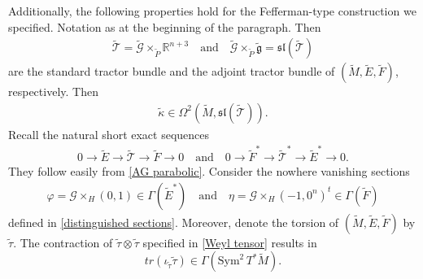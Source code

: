 \documentclass[11pt]{amsart}
\begin{document}
Additionally, the following properties hold for the  Fefferman-type construction we specified. Notation as at the beginning of the paragraph. Then
\begin{align*}
\tilde{\mathcal T}=\tilde{\mathcal G}\times_{\tilde{P}}\mathbb R^{n+3}
\quad\text{and}\quad
\tilde{\mathcal G}\times_{\tilde{P}}\tilde{\mathfrak g}=\mathfrak{sl}(\tilde{\mathcal T})
\end{align*}
are the standard tractor bundle and the adjoint tractor bundle of $(\tilde M,\tilde E,\tilde F)$, respectively. Then
\begin{align*}
    \tilde\kappa\in\Omega^2(\tilde M,\mathfrak{sl}(\tilde{\mathcal T})).
\end{align*}
Recall the natural short exact sequences
\begin{align*}
    0\to\tilde E\to\tilde{\mathcal T}\to\tilde F\to 0\quad\text{and}\quad 0\to \tilde F^*\to\tilde{\mathcal T}^*\to\tilde E^*\to 0.
\end{align*}
They follow easily from \cref{AG parabolic}. Consider the nowhere vanishing sections
\begin{align*}
\varphi=\mathcal G\times_H(0,1)\in\Gamma(\tilde E^*)
\quad\text{and}\quad
\eta=\mathcal G\times_H(-1,0^n)^t\in\Gamma(\tilde F)
\end{align*}
defined in \cref{distinguished sections}. Moreover, denote the torsion of $(\tilde M,\tilde E,\tilde F)$ by $\tilde\tau$. The contraction of $\tilde\tau\otimes\tilde\tau$ specified in \cref{Weyl tensor} results in \[tr(\iota_{\tilde\tau}\tilde\tau)\in\Gamma(\mathrm{Sym}^2\,T^*\tilde M).\]
\end{document}
